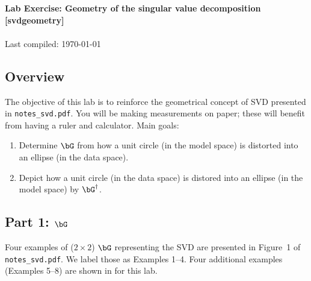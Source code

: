 \documentclass[11pt,titlepage,fleqn]{article}
\newcommand{\nfile}{{\tt notes\_svd.pdf}}
\begin{document}

\begin{spacing}{1.2}
\centering
{\large \bf Lab Exercise: Geometry of the singular value decomposition [svdgeometry]} \\
\cltag\ \\
Last compiled: \today
\end{spacing}



\subsection*{Overview}

The objective of this lab is to reinforce the geometrical concept of SVD \citep{TrefethenBau} presented in \nfile. You will be making measurements on paper; these will benefit from having a ruler and calculator. Main goals:
%
\begin{enumerate}
\item Determine $\bG$ from how a unit circle (in the model space) is distorted into an ellipse (in the data space).
\item Depict how a unit circle (in the data space) is distored into an ellipse (in the model space) by $\bG^{\dagger}$.
\end{enumerate}


\subsection*{Part 1: $\bG$}

Four examples of ($2 \times 2$) $\bG$ representing the SVD are presented in Figure~1 of \nfile. We label those as Examples 1--4. Four additional examples (Examples 5--8) are shown in  for this lab.
\end{document}
